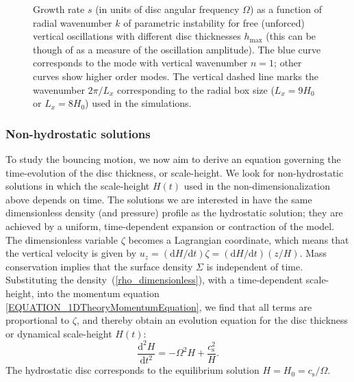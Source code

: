 \documentclass[fleqn,usenatbib]{mnras}
\newcommand{\dd}{\mathrm{d}}
\begin{document}
\begin{figure}
\caption{Growth rate $s$ (in units of disc angular frequency $\Omega$) as a function of radial wavenumber $k$ of parametric instability for free (unforced) vertical oscillations with different disc thicknesses $h_\text{max}$ (this can be though of as a measure of the oscillation amplitude). The blue curve corresponds to the mode with vertical wavenumber $n=1$; other curves show higher order modes. The vertical dashed line marks the wavenumber $2\pi/L_x$ corresponding to the radial box size ($L_x=9H_0$ or $L_x=8H_0$) used in the simulations.}
\label{FIGURE_FreeBounceGrowthRates}
\end{figure}

\subsubsection{Non-hydrostatic solutions}
\label{SECTION_1DTheoryofVerticallyBouncingdisc_NonHydrostaticSolutions}
To study the bouncing motion, we now aim to derive an equation governing the time-evolution of the disc thickness, or scale-height. We look for non-hydrostatic solutions in which the scale-height $H(t)$ used in the non-dimensionalization above depends on time. The solutions we are interested in have the same dimensionless density (and pressure) profile as the hydrostatic solution; they are achieved by a uniform, time-dependent expansion or contraction of the model. The dimensionless variable $\zeta$ becomes a Lagrangian coordinate, which means that the vertical velocity is given by $u_z=(\dd H/\dd t)\zeta=(\dd H/\dd t)(z/H)$. Mass conservation implies that the surface density $\Sigma$ is independent of time. Substituting the density~(\ref{rho_dimensionless}), with a time-dependent scale-height, into the momentum equation \ref{EQUATION_1DTheoryMomentumEquation}, we find that all terms are proportional to $\zeta$, and thereby obtain an evolution equation for the disc thickness or dynamical scale-height $H(t)$:
\begin{equation}
    \frac{\dd^2 H}{\dd t^2} = -\Omega^2 H + \frac{c_\text{s}^2}{H}.
    \label{EQUATION_1DTheoryDynamicalHEvolution2}
\end{equation}
The hydrostatic disc corresponds to the equilibrium solution $H=H_0=c_\text{s}/\Omega$.
\end{document}
